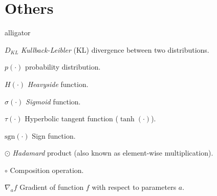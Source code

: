 \section*{Others}
\begin{labeling}{alligator}
	\item [$D_{KL}$] {\textit{Kullback-Leibler} (KL) divergence between two distributions.}
	\item [$p(\cdot)$]{probability distribution.}
	\item [$H(\cdot)$] \textit{Heavyside} function.
	\item [$\sigma(\cdot)$] \textit{Sigmoid} function.
	\item [$\tau(\cdot)$] Hyperbolic tangent function ($\tanh(\cdot)$).
	\item [$\mathrm{sgn}(\cdot)$] Sign function.
	\item [$\odot$] {\textit{Hadamard} product (also known as element-wise multiplication)}.
	\item [$\circ$] Composition operation.
	\item [$\nabla_a f$] Gradient of function $f$ with respect to parameters $a$.

\end{labeling}